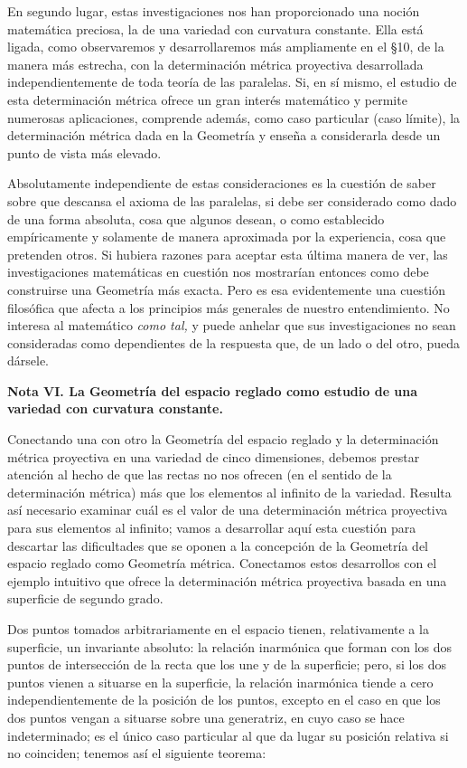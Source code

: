\documentclass[a4paper, 12pt]{article}
\begin{document}
 En segundo lugar, estas investigaciones nos han proporcionado una noción matemática preciosa, la de una variedad con curvatura constante. Ella está ligada, como observaremos y desarrollaremos más ampliamente en el {\S}10, de la manera más estrecha, con la determinación métrica proyectiva desarrollada independientemente de toda teoría de las paralelas. Si, en sí mismo, el estudio de esta determinación métrica ofrece un gran interés matemático y permite numerosas aplicaciones, comprende además, como caso particular (caso límite), la determinación métrica dada en la Geometría y enseña a considerarla desde un punto de vista más elevado.

 Absolutamente independiente de estas consideraciones es la cuestión de saber sobre que descansa el axioma de las paralelas, si debe ser considerado como dado de una forma absoluta, cosa que algunos desean, o como establecido empíricamente y solamente de manera aproximada por la experiencia, cosa que pretenden otros. Si hubiera razones para aceptar esta última manera de ver, las investigaciones matemáticas en cuestión nos mostrarían entonces como debe construirse una Geometría más exacta. Pero es esa evidentemente una cuestión filosófica que afecta a los principios más generales de nuestro entendimiento. No interesa al matemático \textit{como tal, }y puede anhelar que sus investigaciones no sean consideradas como dependientes de la respuesta que, de un lado o del otro, pueda dársele. 



\noindent\textbf{Nota VI. La Geometría del espacio reglado como estudio de una variedad con curvatura constante.}



 Conectando una con otro la Geometría del espacio reglado y la determinación métrica proyectiva en una variedad de cinco dimensiones, debemos prestar atención al hecho de que las rectas no nos ofrecen (en el sentido de la determinación métrica) más que los elementos al infinito de la variedad. Resulta así necesario examinar cuál es el valor de una determinación métrica proyectiva para sus elementos al infinito; vamos a desarrollar aquí esta cuestión para descartar las dificultades que se oponen a la concepción de la Geometría del espacio reglado como Geometría métrica. Conectamos estos desarrollos con el ejemplo intuitivo que ofrece la determinación métrica proyectiva basada en una superficie de segundo grado.

 Dos puntos tomados arbitrariamente en el espacio tienen, relativamente a la superficie, un invariante absoluto: la relación inarmónica que forman con los dos puntos de intersección de la recta que los une y de la superficie; pero, si los dos puntos vienen a situarse en la superficie, la relación inarmónica tiende a cero independientemente de la posición de los puntos, excepto en el caso en que los dos puntos vengan a situarse sobre una generatriz, en cuyo caso se hace indeterminado; es el único caso particular al que da lugar su posición relativa si no coinciden; tenemos así el siguiente teorema:
\end{document}
